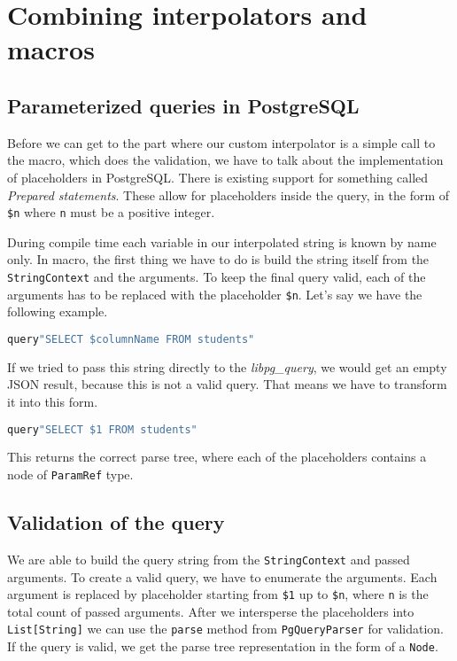 \section{Combining interpolators and macros}
\subsection{Parameterized queries in PostgreSQL}
Before we can get to the part where our custom interpolator is a simple call to the macro, which does the validation, we have to talk about the implementation of placeholders in PostgreSQL. There is existing support for something called \textit{Prepared statements}. These allow for placeholders inside the query, in the form of \texttt{\$n} where \texttt{n} must be a positive integer.  

During compile time each variable in our interpolated string is known by name only. In macro, the first thing we have to do is build the string itself from the \texttt{StringContext} and the arguments. To keep the final query valid, each of the arguments has to be replaced with the placeholder \texttt{\$n}. 
Let's say we have the following example.
\begin{lstlisting}[language=scala, basicstyle=\ttfamily, showstringspaces=false, caption={Query with variable name.}]
query"SELECT $columnName FROM students"
\end{lstlisting}
If we tried to pass this string directly to the \textit{libpg\_query}, we would get an empty JSON result, because this is not a valid query. That means we have to transform it into this form.
\begin{lstlisting}[language=scala, basicstyle=\ttfamily, showstringspaces=false,
caption={Query with a placeholder.}]
query"SELECT $1 FROM students"
\end{lstlisting}
This returns the correct parse tree, where each of the placeholders contains a node of \texttt{ParamRef} type. 

\subsection{Validation of the query}
We are able to build the query string from the \texttt{StringContext} and passed arguments. To create a valid query, we have to enumerate the arguments. Each argument is replaced by placeholder starting from \texttt{\$1} up to \texttt{\$n}, where \texttt{n} is the total count of passed arguments. After we intersperse the placeholders into \texttt{List[String]} we can use the \texttt{parse} method from \texttt{PgQueryParser} for validation. If the query is valid, we get the parse tree representation in the form of a \texttt{Node}.

